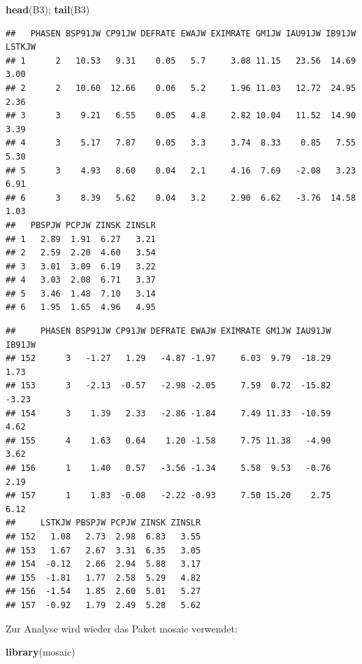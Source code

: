 \documentclass[12pt,ngerman,paper=a4,pagesize,DIV=13]{scrreprt}
\newenvironment{Shaded}{\begin{snugshade}}{\end{snugshade}}
\newcommand{\KeywordTok}[1]{\textcolor[rgb]{0.13,0.29,0.53}{\textbf{#1}}}
\newcommand{\NormalTok}[1]{#1}
\begin{document}
\begin{Shaded}
\begin{Highlighting}[]
\KeywordTok{head}\NormalTok{(B3); }\KeywordTok{tail}\NormalTok{(B3)}
\end{Highlighting}
\end{Shaded}

\begin{verbatim}
##   PHASEN BSP91JW CP91JW DEFRATE EWAJW EXIMRATE GM1JW IAU91JW IB91JW LSTKJW
## 1      2   10.53   9.31    0.05   5.7     3.08 11.15   23.56  14.69   3.00
## 2      2   10.60  12.66    0.06   5.2     1.96 11.03   12.72  24.95   2.36
## 3      3    9.21   6.55    0.05   4.8     2.82 10.04   11.52  14.90   3.39
## 4      3    5.17   7.87    0.05   3.3     3.74  8.33    0.85   7.55   5.30
## 5      3    4.93   8.60    0.04   2.1     4.16  7.69   -2.08   3.23   6.91
## 6      3    8.39   5.62    0.04   3.2     2.90  6.62   -3.76  14.58   1.03
##   PBSPJW PCPJW ZINSK ZINSLR
## 1   2.89  1.91  6.27   3.21
## 2   2.59  2.20  4.60   3.54
## 3   3.01  3.09  6.19   3.22
## 4   3.03  2.08  6.71   3.37
## 5   3.46  1.48  7.10   3.14
## 6   1.95  1.65  4.96   4.95
\end{verbatim}

\begin{verbatim}
##     PHASEN BSP91JW CP91JW DEFRATE EWAJW EXIMRATE GM1JW IAU91JW IB91JW
## 152      3   -1.27   1.29   -4.87 -1.97     6.03  9.79  -18.29   1.73
## 153      3   -2.13  -0.57   -2.98 -2.05     7.59  0.72  -15.82  -3.23
## 154      3    1.39   2.33   -2.86 -1.84     7.49 11.33  -10.59   4.62
## 155      4    1.63   0.64    1.20 -1.58     7.75 11.38   -4.90   3.62
## 156      1    1.40   0.57   -3.56 -1.34     5.58  9.53   -0.76   2.19
## 157      1    1.83  -0.08   -2.22 -0.93     7.50 15.20    2.75   6.12
##     LSTKJW PBSPJW PCPJW ZINSK ZINSLR
## 152   1.08   2.73  2.98  6.83   3.55
## 153   1.67   2.67  3.31  6.35   3.05
## 154  -0.12   2.66  2.94  5.88   3.17
## 155  -1.81   1.77  2.58  5.29   4.82
## 156  -1.54   1.85  2.60  5.01   5.27
## 157  -0.92   1.79  2.49  5.28   5.62
\end{verbatim}

Zur Analyse wird wieder das Paket mosaic verwendet:

\begin{Shaded}
\begin{Highlighting}[]
\KeywordTok{library}\NormalTok{(mosaic)}
\end{Highlighting}
\end{Shaded}
\end{document}
